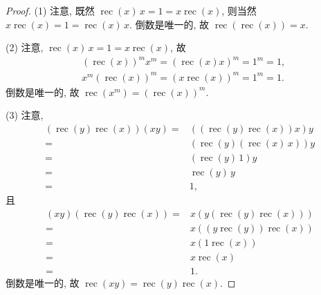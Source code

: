 \documentclass[../libro.tex]{subfiles}
\begin{document}
\begin{proof}
    (1)
    注意, 既然
    \(\operatorname{rec} {(x)}\, x
    = 1 = x \operatorname{rec} {(x)}\),
    则当然
    \(x \operatorname{rec} {(x)} = 1
    = \operatorname{rec} {(x)}\, x\).
    倒数是唯一的, 故
    \(\operatorname{rec} {(\operatorname{rec} {(x)})} = x\).

    (2)
    注意,
    \(\operatorname{rec} {(x)}\, x
    = 1 = x \operatorname{rec} {(x)}\),
    故
    \begin{align*}
        &
        (\operatorname{rec} {(x)})^m x^m
        = (\operatorname{rec} {(x)} x)^m
        = 1^m
        = 1,
        \\
        &
        x^m (\operatorname{rec} {(x)})^m
        = (x \operatorname{rec} {(x)})^m
        = 1^m
        = 1.
    \end{align*}
    倒数是唯一的, 故
    \(\operatorname{rec} {(x^m)} = (\operatorname{rec} {(x)})^m\).

    (3)
    注意,
    \begin{align*}
        (\operatorname{rec} {(y)} \operatorname{rec} {(x)})
        (x y)
        = {} &
        ((\operatorname{rec} {(y)} \operatorname{rec} {(x)}) x)
        y
        \\
        = {} &
        (\operatorname{rec} {(y)} (\operatorname{rec} {(x)}\, x))
        y
        \\
        = {} &
        (\operatorname{rec} {(y)}\, 1) y
        \\
        = {} &
        \operatorname{rec} {(y)}\, y
        \\
        = {} &
        1,
    \end{align*}
    且
    \begin{align*}
        (x y)
        (\operatorname{rec} {(y)} \operatorname{rec} {(x)})
        = {} &
        x
        (y (\operatorname{rec} {(y)} \operatorname{rec} {(x)}))
        \\
        = {} &
        x
        ((y \operatorname{rec} {(y)}) \operatorname{rec} {(x)})
        \\
        = {} &
        x (1 \operatorname{rec} {(x)})
        \\
        = {} &
        x \operatorname{rec} {(x)}
        \\
        = {} &
        1.
    \end{align*}
    倒数是唯一的, 故
    \(\operatorname{rec} {(x y)}
    = \operatorname{rec} {(y)} \operatorname{rec} {(x)}\).


\end{proof}
\end{document}
